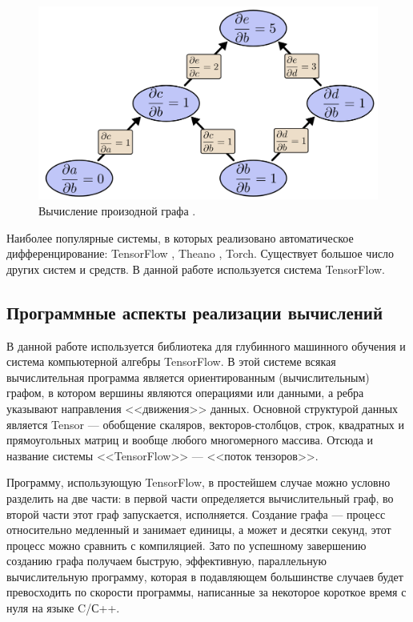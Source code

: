 \documentclass[a4paper,14pt]{extarticle}
\begin{document}
\begin{figure}[H]
\includegraphics[width=\textwidth]{tree-forwardmode}
\caption{Вычисление произодной графа \cite{colah}.}
\end{figure}

Наиболее популярные системы, в которых реализовано автоматическое
дифференцирование: TensorFlow \cite{tf}, Theano \cite{theano},
Torch\cite{torch}. Существует большое число других систем и средств. В данной
работе используется система TensorFlow.

\subsection{Программные аспекты реализации вычислений}

В данной работе используется библиотека для глубинного машинного обучения и
система компьютерной алгебры TensorFlow. В этой системе всякая вычислительная
программа является ориентированным (вычислительным) графом, в котором вершины
являются операциями или данными, а ребра указывают направления <<движения>>
данных. Основной структурой данных является Tensor --- обобщение скаляров,
векторов-столбцов, строк, квадратных и прямоугольных матриц и вообще любого
многомерного массива. Отсюда и название системы <<TensorFlow>> --- <<поток
тензоров>>.

Программу, использующую TensorFlow, в простейшем случае можно условно разделить
на две части: в первой части определяется вычислительный граф, во второй части
этот граф запускается, исполняется. Создание графа --- процесс относительно
медленный и занимает единицы, а может и десятки секунд, этот процесс можно
сравнить с компиляцией. Зато по успешному завершению созданию графа получаем
быструю, эффективную, параллельную вычислительную программу, которая в
подавляющем большинстве случаев будет превосходить по скорости программы,
написанные за некоторое короткое время с нуля на языке C/С++.
\end{document}
